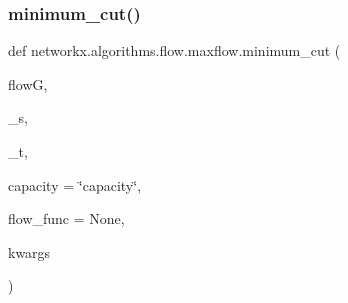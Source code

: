 \subsubsection{\texorpdfstring{minimum\+\_\+cut()}{minimum\_cut()}}
{\footnotesize\ttfamily def networkx.\+algorithms.\+flow.\+maxflow.\+minimum\+\_\+cut (\begin{DoxyParamCaption}\item[{}]{flowG,  }\item[{}]{\+\_\+s,  }\item[{}]{\+\_\+t,  }\item[{}]{capacity = {\ttfamily \char`\"{}capacity\char`\"{}},  }\item[{}]{flow\+\_\+func = {\ttfamily None},  }\item[{}]{kwargs }\end{DoxyParamCaption})}


